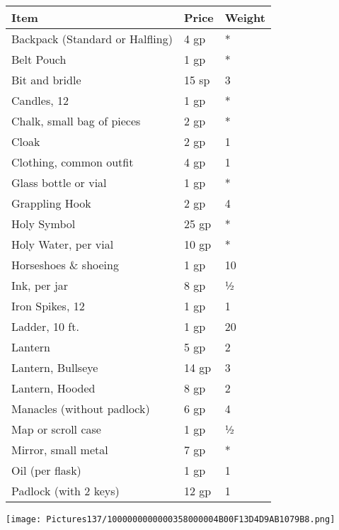 \documentclass[a4paper,twoside,openany,10pt]{book}
\begin{document}
\begin{multicols}{2}
\begin{tabular*}{0.93\linewidth}{@{\extracolsep{\fill}}lll}
\textbf{Item} & \textbf{Price} & \textbf{Weight} \\\toprule
Backpack (Standard or Halfling) & 4 gp & * \\\hline
Belt Pouch & 1 gp & * \\\hline
Bit and bridle & 15 sp & 3 \\\hline
Candles, 12 & 1 gp & * \\\hline
Chalk, small bag of pieces & 2 gp & * \\\hline
Cloak & 2 gp & 1 \\\hline
Clothing, common outfit & 4 gp & 1 \\\hline
Glass bottle or vial & 1 gp & * \\\hline
Grappling Hook & 2 gp & 4 \\\hline
Holy Symbol & 25 gp & * \\\hline
Holy Water, per vial & 10 gp & * \\\hline
Horseshoes \& shoeing & 1 gp & 10 \\\hline
Ink, per jar & 8 gp & ½ \\\hline
Iron Spikes, 12 & 1 gp & 1 \\\hline
Ladder, 10 ft. & 1 gp & 20 \\\hline
Lantern & 5 gp & 2 \\\hline
Lantern, Bullseye & 14 gp & 3 \\\hline
Lantern, Hooded & 8 gp & 2 \\\hline
Manacles (without padlock) & 6 gp & 4 \\\hline
Map or scroll case & 1 gp & ½ \\\hline
Mirror, small metal & 7 gp & * \\\hline
Oil (per flask) & 1 gp & 1 \\\hline
Padlock (with 2 keys) & 12 gp & 1 \\\bottomrule
\end{tabular*}

\texttt{[image: Pictures137/1000000000000358000004B00F13D4D9AB1079B8.png]}
\vfill


\end{multicols}
\end{document}
